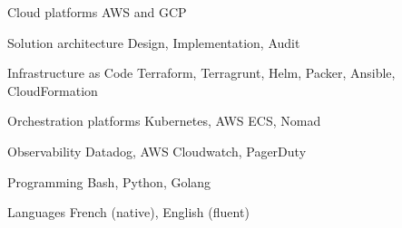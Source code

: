 

\begin{cvskills}

  \cvskill
    {Cloud platforms} %
    {AWS and GCP} %

  \cvskill
    {Solution architecture} %
    {Design, Implementation, Audit} %

  \cvskill
    {Infrastructure as Code} %
    {Terraform, Terragrunt, Helm, Packer, Ansible, CloudFormation} %

  \cvskill
    {Orchestration platforms} %
    {Kubernetes, AWS ECS, Nomad} %

  \cvskill
    {Observability} %
    {Datadog, AWS Cloudwatch, PagerDuty} %

  \cvskill
    {Programming} %
    {Bash, Python, Golang} %

  \cvskill
    {Languages} %
        {French (native), English (fluent)} %

\end{cvskills}

